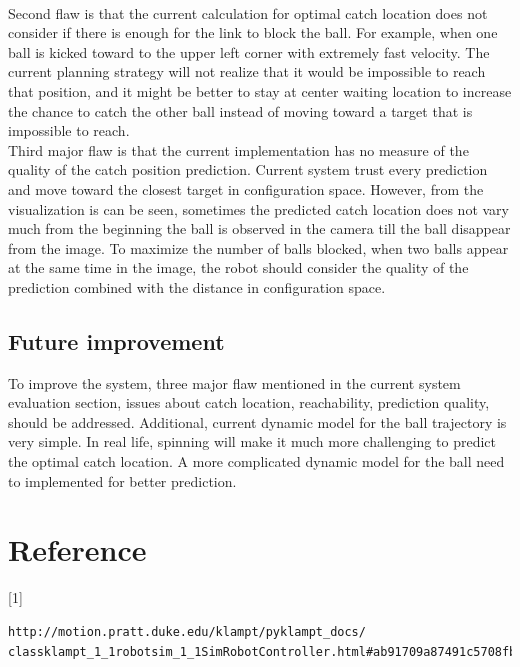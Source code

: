 \documentclass[a4paper]{article}
\begin{document}
\\
Second flaw is that the current calculation for optimal catch location does not consider if there is enough for the link to block the ball. For example, when one ball is kicked toward to the upper left corner with extremely fast velocity. The current planning strategy will not realize that it would be impossible to reach that position, and it might be better to stay at center waiting location to increase the chance to catch the other ball instead of moving toward a target that is impossible to reach.
\\
Third major flaw is that the current implementation has no measure of the quality of the catch position prediction. Current system trust  every prediction and move toward the closest target in configuration space. However, from the visualization is can be seen, sometimes the predicted catch location does not vary much from the beginning the ball is observed in the camera till the ball disappear from the image. To maximize the number of balls blocked, when two balls appear at the same time in the image, the robot should consider the quality of the prediction combined with the distance in configuration space. 
\subsection{Future improvement}
To improve the system, three major flaw mentioned in the current system evaluation section, issues about catch location, reachability, prediction quality, should be addressed. Additional, current dynamic model for the ball trajectory is very simple. In real life, spinning will make it much more challenging to predict the optimal catch location. A more complicated dynamic model for the ball need to implemented for better prediction. 
\pagebreak
\section{Reference}
[1]
\begin{verbatim}
http://motion.pratt.duke.edu/klampt/pyklampt_docs/
classklampt_1_1robotsim_1_1SimRobotController.html#ab91709a87491c5708fb2e46fa593780b
\end{verbatim}
\end{document}
